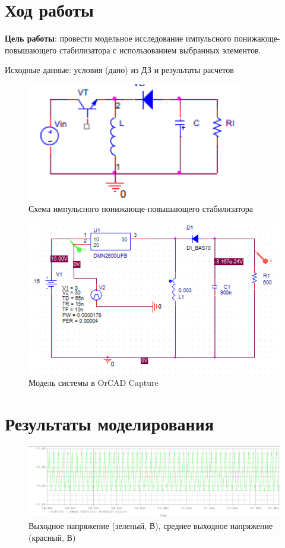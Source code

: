 \chapter{Ход работы}

\textbf{Цель работы}: провести модельное исследование импульсного понижающе-повышающего стабилизатора с использованием выбранных элементов.

Исходные данные: условия (дано) из ДЗ и результаты расчетов

\begin{figure}[h!]
	\centering
	\caption{Схема импульсного понижающе-повышающего стабилизатора}
	\includegraphics{images/1.png}
\end{figure}


\begin{figure}[h!]
	\centering
	\caption{Модель системы в OrCAD Capture}
	\includegraphics{images/2.png}
\end{figure}

\chapter{Результаты моделирования}

\begin{figure}[h!]
	\centering
	\caption{Выходное напряжение (зеленый, В), среднее выходное напряжение (красный, В)}
	\includegraphics{images/3.png}
\end{figure}

